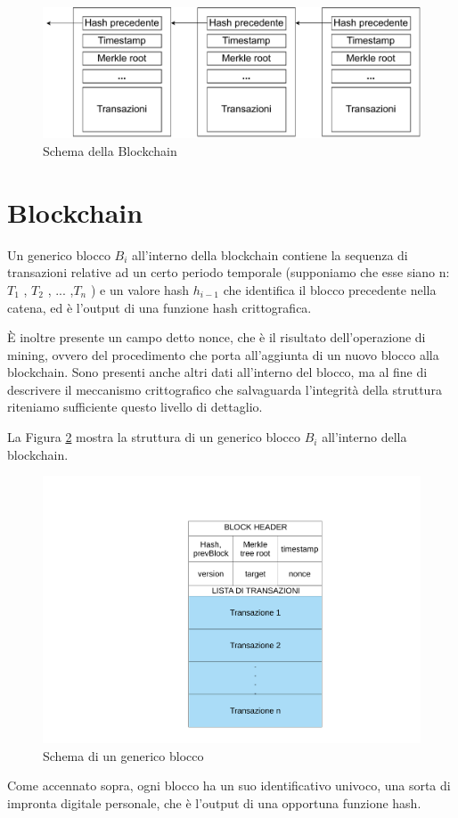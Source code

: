 \begin{figure}[h!]
    \centering
    \includegraphics[scale=0.6]{Images/blockChaining.pdf}
    \caption{Schema della Blockchain}
    \label{fig:blockchain}
\end{figure}
\FloatBarrier
\section{Blockchain}
Un generico blocco $B_i$ all’interno della blockchain contiene la sequenza di transazioni relative ad un certo periodo temporale (supponiamo che esse siano n: $T_1$ , $T_2$ , ... ,$T_n$ ) e un valore hash $h_{i-1}$ che identifica il blocco precedente nella catena, ed è l’output di una funzione hash crittografica.

È inoltre presente un campo detto nonce, che è il risultato dell’operazione di mining, ovvero del procedimento che porta all’aggiunta di un nuovo blocco alla blockchain. Sono presenti anche altri dati all’interno del blocco, ma al fine di descrivere il meccanismo crittografico che salvaguarda l’integrità della struttura riteniamo sufficiente questo livello di dettaglio.

La Figura \ref{fig:blocchi} mostra la struttura di un generico blocco $B_i$ all’interno della blockchain.
\begin{figure}[h!]
    \centering
    \includegraphics[scale=0.4, trim = 0cm 0cm 0cm 3cm, clip]{Images/blocco_singolo.pdf}
    \caption{Schema di un generico blocco}
    \label{fig:blocchi}
\end{figure}
\FloatBarrier
Come accennato sopra, ogni blocco ha un suo identificativo univoco, una sorta di impronta digitale personale, che è l’output di una opportuna funzione hash.

